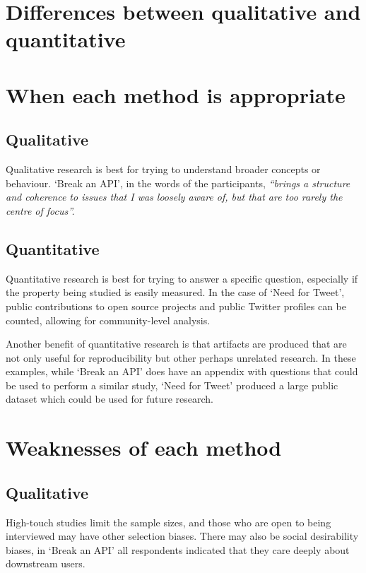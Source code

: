 \documentclass[conference]{IEEEtran}
\begin{document}
\section{Differences between qualitative and quantitative}

\section{When each method is appropriate}

\subsection{Qualitative}

Qualitative research is best for trying to understand broader concepts or behaviour.
`Break an API', in the words of the participants, \textit{ ``brings a structure and coherence to issues that I was loosely aware of, but that are too rarely the centre of focus''.}
\subsection{Quantitative}

Quantitative research is best for trying to answer a specific question, especially if the property being studied is easily measured. In the case of `Need for Tweet', public contributions to open source projects and public Twitter profiles can be counted, allowing for community-level analysis.

Another benefit of quantitative research is that artifacts are produced that are not only useful for reproducibility but other perhaps unrelated research. In these examples, while `Break an API' does have an appendix with questions that could be used to perform a similar study, `Need for Tweet' produced a large public dataset which could be used for future research.

\section{Weaknesses of each method}

\subsection{Qualitative}

High-touch studies limit the sample sizes, and those who are open to being interviewed may have other selection biases. There may also be social desirability biases, in `Break an API' all respondents indicated that they care deeply about downstream users.
\end{document}

